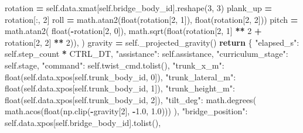 \documentclass[
  chinese,
  11pt,
  letterpaper,
]{article}
\newenvironment{Shaded}{\begin{snugshade}}{\end{snugshade}}
\newcommand{\BuiltInTok}[1]{#1}
\newcommand{\ControlFlowTok}[1]{\textcolor[rgb]{0.13,0.29,0.53}{\textbf{#1}}}
\newcommand{\DecValTok}[1]{\textcolor[rgb]{0.00,0.00,0.81}{#1}}
\newcommand{\FloatTok}[1]{\textcolor[rgb]{0.00,0.00,0.81}{#1}}
\newcommand{\NormalTok}[1]{#1}
\newcommand{\OperatorTok}[1]{\textcolor[rgb]{0.81,0.36,0.00}{\textbf{#1}}}
\newcommand{\StringTok}[1]{\textcolor[rgb]{0.31,0.60,0.02}{#1}}
\newcommand{\VariableTok}[1]{\textcolor[rgb]{0.00,0.00,0.00}{#1}}
\renewenvironment{Shaded}{\par\smallskip}{\par\smallskip}
\begin{document}
\begin{Shaded}
\begin{Highlighting}[]
\NormalTok{        rotation }\OperatorTok{=} \VariableTok{self}\NormalTok{.data.xmat[}\VariableTok{self}\NormalTok{.bridge\_body\_id].reshape(}\DecValTok{3}\NormalTok{, }\DecValTok{3}\NormalTok{)}
\NormalTok{        plank\_up }\OperatorTok{=}\NormalTok{ rotation[:, }\DecValTok{2}\NormalTok{]}
\NormalTok{        roll }\OperatorTok{=}\NormalTok{ math.atan2(}\BuiltInTok{float}\NormalTok{(rotation[}\DecValTok{2}\NormalTok{, }\DecValTok{1}\NormalTok{]), }\BuiltInTok{float}\NormalTok{(rotation[}\DecValTok{2}\NormalTok{, }\DecValTok{2}\NormalTok{]))}
\NormalTok{        pitch }\OperatorTok{=}\NormalTok{ math.atan2(}
            \BuiltInTok{float}\NormalTok{(}\OperatorTok{{-}}\NormalTok{rotation[}\DecValTok{2}\NormalTok{, }\DecValTok{0}\NormalTok{]),}
\NormalTok{            math.sqrt(}\BuiltInTok{float}\NormalTok{(rotation[}\DecValTok{2}\NormalTok{, }\DecValTok{1}\NormalTok{] }\OperatorTok{**} \DecValTok{2} \OperatorTok{+}\NormalTok{ rotation[}\DecValTok{2}\NormalTok{, }\DecValTok{2}\NormalTok{] }\OperatorTok{**} \DecValTok{2}\NormalTok{)),}
\NormalTok{        )}
\NormalTok{        gravity }\OperatorTok{=} \VariableTok{self}\NormalTok{.\_projected\_gravity()}
        \ControlFlowTok{return}\NormalTok{ \{}
            \StringTok{"elapsed\_s"}\NormalTok{: }\VariableTok{self}\NormalTok{.step\_count }\OperatorTok{*}\NormalTok{ CTRL\_DT,}
            \StringTok{"assistance"}\NormalTok{: }\VariableTok{self}\NormalTok{.assistance,}
            \StringTok{"curriculum\_stage"}\NormalTok{: }\VariableTok{self}\NormalTok{.stage,}
            \StringTok{"command"}\NormalTok{: }\VariableTok{self}\NormalTok{.twist\_cmd.tolist(),}
            \StringTok{"trunk\_x\_m"}\NormalTok{: }\BuiltInTok{float}\NormalTok{(}\VariableTok{self}\NormalTok{.data.xpos[}\VariableTok{self}\NormalTok{.trunk\_body\_id, }\DecValTok{0}\NormalTok{]),}
            \StringTok{"trunk\_lateral\_m"}\NormalTok{: }\BuiltInTok{float}\NormalTok{(}\VariableTok{self}\NormalTok{.data.xpos[}\VariableTok{self}\NormalTok{.trunk\_body\_id, }\DecValTok{1}\NormalTok{]),}
            \StringTok{"trunk\_height\_m"}\NormalTok{: }\BuiltInTok{float}\NormalTok{(}\VariableTok{self}\NormalTok{.data.xpos[}\VariableTok{self}\NormalTok{.trunk\_body\_id, }\DecValTok{2}\NormalTok{]),}
            \StringTok{"tilt\_deg"}\NormalTok{: math.degrees(}
\NormalTok{                math.acos(}\BuiltInTok{float}\NormalTok{(np.clip(}\OperatorTok{{-}}\NormalTok{gravity[}\DecValTok{2}\NormalTok{], }\OperatorTok{{-}}\FloatTok{1.0}\NormalTok{, }\FloatTok{1.0}\NormalTok{)))}
\NormalTok{            ),}
            \StringTok{"bridge\_position"}\NormalTok{: }\VariableTok{self}\NormalTok{.data.xpos[}\VariableTok{self}\NormalTok{.bridge\_body\_id].tolist(),}

\end{Highlighting}
\end{Shaded}
\end{document}
